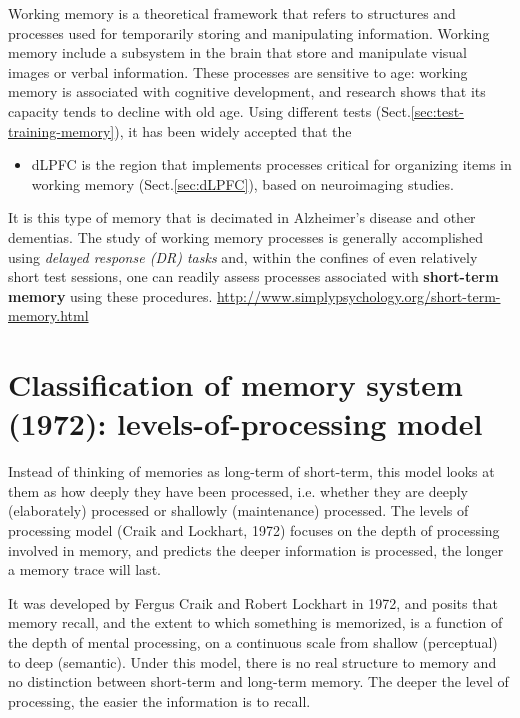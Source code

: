 Working memory is a theoretical framework that refers to structures and
processes used for temporarily storing and manipulating information.
Working memory include a subsystem in the brain that store and manipulate visual
images or verbal information.
These processes are sensitive to age: working memory is associated with
cognitive development, and research shows that its capacity tends to decline
with old age. Using different tests (Sect.\ref{sec:test-training-memory}), it
has been widely accepted that the 
\begin{itemize}
  \item dLPFC is the region that implements processes critical for organizing
  items in working memory (Sect.\ref{sec:dLPFC}), based on neuroimaging studies.

\end{itemize}
  
It is this type of memory that is decimated in Alzheimer's disease and other
dementias. The study of working memory processes is generally accomplished using
{\it delayed response (DR) tasks} and, within the confines of even relatively
short test sessions, one can readily assess processes associated with {\bf
short-term memory} using these procedures.
\url{http://www.simplypsychology.org/short-term-memory.html}


  


\section{Classification of memory system  (1972): levels-of-processing model}
\label{sec:level-of-processing-model}

Instead of thinking of memories as long-term of short-term, this model looks at
them as how deeply they have been processed, i.e. whether they are deeply
(elaborately) processed or shallowly (maintenance) processed.
The levels of processing model (Craik and Lockhart, 1972) focuses on the depth
of processing involved in memory, and predicts the deeper information is
processed, the longer a memory trace will last.


It was developed by Fergus Craik and Robert Lockhart in 1972, and posits that
memory recall, and the extent to which something is memorized, is a function of
the depth of mental processing, on a continuous scale from shallow (perceptual)
to deep (semantic). Under this model, there is no real structure to memory and
no distinction between short-term and long-term memory.
The deeper the level of processing, the easier the information is to recall.

